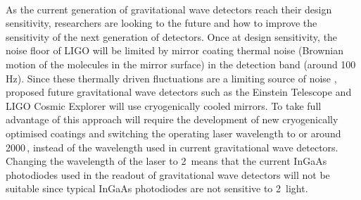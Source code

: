 \paragraph{} %
As the current generation of gravitational wave detectors reach their design sensitivity, researchers are looking to the future and how to improve the sensitivity of the next generation of detectors. Once at design sensitivity, the noise floor of LIGO will be limited by mirror coating thermal noise (Brownian motion of the molecules in the mirror surface) in the detection band (around 100 Hz)\cite{a+curve}. Since these thermally driven fluctuations are a limiting source of noise \cite{InstrumentWhitePaper2018}, proposed future gravitational wave detectors such as the Einstein Telescope \cite{Punturo2010} and LIGO Cosmic Explorer \cite{Abbott2017e} will use cryogenically cooled mirrors. To take full advantage of this approach will require the development of new cryogenically optimised coatings and switching the operating laser wavelength to  or around 2000\,\SIunits{\nano\metre}, instead of the  wavelength used in current gravitational wave detectors. Changing the wavelength of the laser to 2\,\SIunits{\micro\metre} means that the current InGaAs photodiodes used in the readout of gravitational wave detectors will not be suitable since typical InGaAs photodiodes are not sensitive to 2\,\SIunits{\micro\metre} light.
